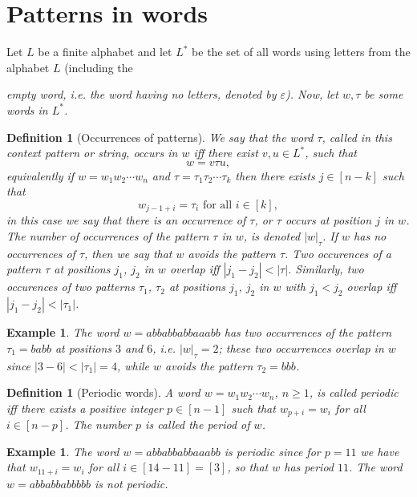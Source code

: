 \documentclass[12pt]{report}
\newtheorem{defn}[mythm]{Definition}
\newtheorem{exa}[mythm]{Example}
\begin{document}
\section{Patterns in words}


Let $L$ be a finite alphabet and let $L^*$ be the set of all words using letters from the alphabet $L$ (including the {\em empty word, i.e. the word having no letters, denoted by $\varepsilon$). Now,  let $w, \tau$ be some words in $L^*$.

\begin{defn}[Occurrences of patterns]
We say that the word $\tau$, called in this context {\em pattern} or {\em string}, {\em occurs} in $w$ iff there exist $v, u \in L^*$, such that 
\[ w = v \tau u,\] 
equivalently if $w = w_1 w_2 \cdots w_n$ and $\tau = \tau_1 \tau_2 \cdots \tau_k$ then there exists $j \in [n-k]$ such that
\[ w_{j - 1 + i} = \tau_i \textrm{ for all } i \in [k], \]
in this case we say that there is an {\em occurrence of $\tau$}, or {\em $\tau$ occurs at position $j$ in $w$}.
The number of occurrences of the pattern $\tau$ in $w$, is denoted $|w|_\tau$. If $w$ has no occurrences of $\tau$, then we say that $w$ {\em avoids} the pattern $\tau$. Two occurences of a pattern $\tau$ at positions $j_1$, $j_2$ in $w$ {\em overlap} iff $|j_1 - j_2| < |\tau|$. Similarly, two occurences of two patterns $\tau_1$, $\tau_2$ at positions $j_1$, $j_2$ in $w$ with $j_1 < j_2$ {\em overlap} iff $|j_1 - j_2| < |\tau_1|$.
\end{defn}

\begin{exa}
The word $w = a b b a b b a b b a a a b b$ has two occurrences of the pattern $\tau_1 = b a b b$ at positions $3$ and $6$, i.e. $|w|_\tau = 2$; these two occurrences overlap in $w$ since $|3 - 6| < |\tau_1| = 4$, while $w$ avoids the pattern $\tau_2 = b b b$.
\end{exa}

\begin{defn}[Periodic words]
A word $w = w_1 w_2 \cdots w_n$, $n \ge 1$, is called {\em periodic} iff there exists a positive integer $p \in [n-1]$ such that $w_{p+i} = w_{i}$ for all $i \in [n-p]$.
The number $p$ is called the {\em period} of $w$. 
\end{defn}

\begin{exa} The word $w = a b b a b b a b b a a a b b$ is periodic since for $p = 11$ we have that $w_{11 + i} = w_i$ for all $i \in [14-11] = [3]$, so that $w$ has period $11$. The word $w = a b b a b b a b b b b b$ is not periodic.
\end{exa}

}
\end{document}
